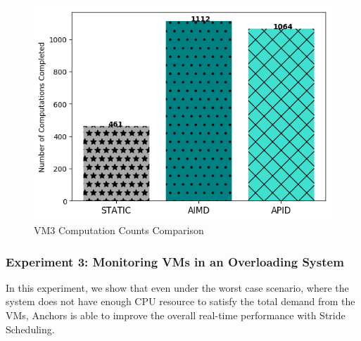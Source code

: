 \begin{itemize}
\begin{figure}[h!]
\centering
\includegraphics[width=1\linewidth]{images/matmul}
\caption{VM3 Computation Counts Comparison}
\label{matmul}
\end{figure}






\end{itemize}
\subsubsection{Experiment 3: Monitoring VMs in an Overloading System}

In this experiment, we show that even under the worst case scenario, where the system does not have enough CPU resource to satisfy the total demand from the VMs, Anchors is able to improve the overall real-time performance with Stride Scheduling. 



